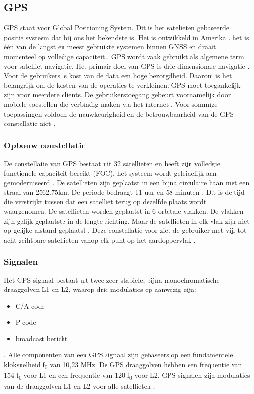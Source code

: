\subsection{GPS}
\label{LGPS} 
GPS staat voor Global Positioning System. Dit is het satelieten gebaseerde positie systeem dat bij ons het bekendste is. Het is ontwikkeld in Amerika \cite{LBibGNSS}\cite{LBibGNSS3}. het is \'e\'en van de langst en meest gebruikte systemen binnen GNSS en draait momenteel op volledige capaciteit \cite{LBibGNSS4,LBibGNSS8}. GPS wordt vaak gebruikt als algemene term voor satelliet navigatie. Het primair doel van GPS is drie dimensionale navigatie \cite{LBibGNSS8}. Voor de gebruikers is kost van de data een hoge bezorgdheid. Daarom is het belangrijk om de kosten van de operaties te verkleinen. GPS moet toegankelijk zijn voor meerdere clients. De gebruikerstoegang gebeurt voornamelijk door mobiele toestellen die verbindig maken via het internet \cite{LBibGPS}. Voor sommige toepassingen voldoen de nauwkeurigheid en de betrouwbaarheid van de GPS constellatie niet \cite{LBibGNSS6}.

\subsubsection{Opbouw constellatie}
 De constellatie van GPS bestaat uit 32 satellieten en heeft zijn volledgie functionele capaciteit bereikt (FOC), het systeem wordt geleidelijk aan gemoderniseerd \cite{LBibGNSS4}. De satellieten zijn geplaatst in een bijna circulaire baan met een straal van 2562.75km. De periode bedraagt 11 uur en 58 minuten \cite{LBibGNSS6,LBibGNSS8}. Dit is de tijd die verstrijkt tussen dat een satelliet terug op dezelfde plaats wordt waargenomen. De satellieten worden geplaatst in 6 orbitale vlakken. De vlakken zijn gelijk geplaatste in de lengte richting. Maar de satellieten in elk vlak zijn niet op gelijke afstand geplaatst \cite{LBibGNSS6}. Deze constellatie voor ziet de gebruiker met vijf tot acht zcihtbare satellieten vanop elk punt op het aardoppervlak \cite{LBibGNSS8}.

\subsubsection{Signalen}
Het GPS signaal bestaat uit twee zeer stabiele, bijna monochromatische draaggolven L1 en L2, waarop drie modulaties op aanwezig zijn:
\begin{itemize}
	\item C/A code
	\item P code
	\item broadcast bericht
\end{itemize}. 
Alle componenten van een GPS signaal zijn gebaseers op een fundamentele kloksnelheid f\textsubscript{0} van 10,23 MHz. De GPS draaggolven hebben een frequentie van 154 f\textsubscript{0} voor L1 en een frequentie van 120 f\textsubscript{0} voor L2\cite{LBibGPS2}. GPS signalen zijn modulaties van de draaggolven L1 en L2 voor alle satellieten \cite{LBibGPS3}.

